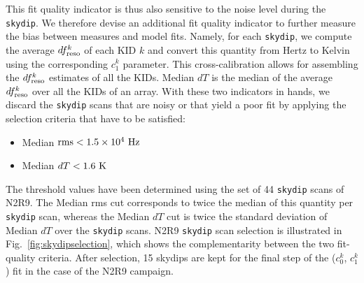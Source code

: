 %
This fit quality indicator is thus also sensitive to the noise
level during the {\tt skydip}. We therefore devise an additional fit quality
indicator to further measure the bias between measures and model fits.
Namely, for each {\tt skydip}, we compute the average
$df_{\rm{reso}}^k$ of each KID $k$ and convert this quantity from Hertz to Kelvin
using the corresponding $c_1^k$ parameter. This cross-calibration
allows for assembling the $df_{\rm{reso}}^k$ estimates of all the KIDs.
Median $dT$ is the median of the average $df_{\rm{reso}}^k$ over all the KIDs of an
array. With these two indicators in hands, we discard the {\tt skydip} scans
that are noisy or that yield a poor fit by applying the selection
criteria that have to be satisfied:

\begin{itemize}
\item Median $\rm{rms} < 1.5 \times 10^{4}~\rm{Hz}$
\item Median $dT < 1.6~\rm{K}$
\end{itemize}

The threshold values have been determined using the set of 44 {\tt skydip}
scans of N2R9. The Median rms cut corresponds to twice the median of
this quantity per {\tt skydip} scan, whereas the Median $dT$ cut is twice
the standard deviation of Median $dT$ over the {\tt skydip} scans.
N2R9 {\tt skydip} scan selection is illustrated in
{\lp Fig.~\ref{fig:skydipselection},
which shows the complementarity between the two fit-quality
criteria. After selection, 15 skydips are kept for the final step of
the ($c_0^k$, $c_1^k$) fit in the case of the N2R9 campaign.}

